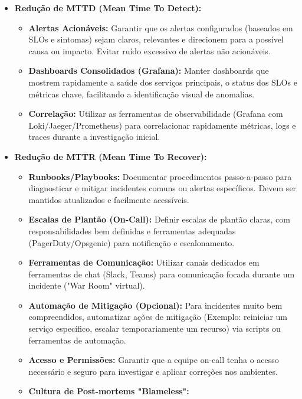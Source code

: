 \begin{itemize}
    \item \textbf{Redução de MTTD (Mean Time To Detect):}
        \begin{itemize}
            \item \textbf{Alertas Acionáveis:} Garantir que os alertas configurados (baseados em SLOs e sintomas) sejam claros, relevantes e direcionem para a possível causa ou impacto. Evitar ruído excessivo de alertas não acionáveis.
            \item \textbf{Dashboards Consolidados (Grafana):} Manter dashboards que mostrem rapidamente a saúde dos serviços principais, o status dos SLOs e métricas chave, facilitando a identificação visual de anomalias.
            \item \textbf{Correlação:} Utilizar as ferramentas de observabilidade (Grafana com Loki/Jaeger/Prometheus) para correlacionar rapidamente métricas, logs e traces durante a investigação inicial.
        \end{itemize}
    \item \textbf{Redução de MTTR (Mean Time To Recover):}
        \begin{itemize}
            \item \textbf{Runbooks/Playbooks:} Documentar procedimentos passo-a-passo para diagnosticar e mitigar incidentes comuns ou alertas específicos. Devem ser mantidos atualizados e facilmente acessíveis.
            \item \textbf{Escalas de Plantão (On-Call):} Definir escalas de plantão claras, com responsabilidades bem definidas e ferramentas adequadas (PagerDuty/Opsgenie) para notificação e escalonamento.
            \item \textbf{Ferramentas de Comunicação:} Utilizar canais dedicados em ferramentas de chat (Slack, Teams) para comunicação focada durante um incidente ("War Room" virtual).
            \item \textbf{Automação de Mitigação (Opcional):} Para incidentes muito bem compreendidos, automatizar ações de mitigação (Exemplo: reiniciar um serviço específico, escalar temporariamente um recurso) via scripts ou ferramentas de automação.
            \item \textbf{Acesso e Permissões:} Garantir que a equipe on-call tenha o acesso necessário e seguro para investigar e aplicar correções nos ambientes.
            \item \textbf{Cultura de Post-mortems "Blameless":}
                \begin{itemize}

\end{itemize}
\end{itemize}
\end{itemize}
